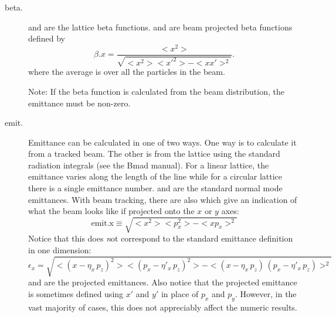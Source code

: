   \begin{description}
  \item[beta.] \Newline
{} and  are the lattice beta functions.  and
 are beam projected beta functions defined by
\begin{equation}
  \beta.x = \frac{<x^{2}>}{\sqrt{<x^{2}> <x'^{2}> - <x x'>^{2}}}.
\end{equation}
where the average \vn{<>} is over all the particles in the beam.

Note: If the beta function is calculated from the beam distribution,
the emittance must be non-zero.

  \item[emit.] \Newline
Emittance can be calculated in one of two ways. One way is to
calculate it from a tracked beam. The other is from the lattice using
the standard radiation integrals (see the Bmad manual). For a linear
lattice, the emittance varies along the length of the line while for a
circular lattice there is a single emittance number. 
and  are the standard normal mode emittances. With
beam tracking, there are also  which give an
indication of what the beam looks like if projected onto the $x$ or
$y$ axes:
\begin{equation}
  \mbox{emit.x} \equiv \sqrt{<x^2> <p_x^2> - <x p_x>^2}
\end{equation}
Notice that this does {\emph not} correspond to the standard emittance
definition in one dimension:
\begin{equation}
  \epsilon_x = \sqrt{<(x - \eta_x \, p_z)^2> <(p_x - \eta'_x \, p_z)^2> - 
  <(x - \eta_x \, p_z) \, (p_x - \eta'_x \, p_z)>^2}
\end{equation}
 and  are the projected emittances.
Also notice that the projected emittance is sometimes defined using
$x'$ and $y'$ in place of $p_x$ and $p_y$. However, in the vast
majority of cases, this does not appreciably affect the numeric
results.


\end{description}
